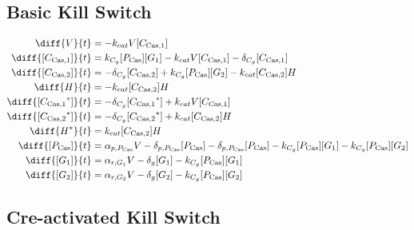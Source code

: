 \subsection{Basic Kill Switch}
\label{s:Basic_kill_switch}

\begin{align}
\diff{\vectorGen{}}{t} & = - \casCutRate{{}}\vectorGen{}\conc{\cplx{\cas}{1}}\\
\diff{\conc{\cplx{\cas}{1}}}{t} & =  \gRnaBind{}\conc{\proSp{\cas{}}}\conc{\gRna{1}} - \casCutRate{{}}\vectorGen{}\conc{\cplx{\cas}{1}} - \casCompDegradeRate{}\conc{\cplx{\cas}{1}}\\
\diff{\conc{\cplx{\cas}{2}}}{t} & = - \casCompDegradeRate{}\conc{\cplx{\cas}{2}} + \gRnaBind{}\conc{\proSp{\cas{}}}\conc{\gRna{2}} - \casCutRate{{}}\conc{\cplx{\cas}{2}}\hostGen{}\\
\diff{\hostGen{}}{t} & = - \casCutRate{{}}\conc{\cplx{\cas}{2}}\hostGen{}\\
\diff{\conc{\bound{\cplx{\cas}{1}}}}{t} & = - \casCompDegradeRate{}\conc{\bound{\cplx{\cas}{1}}} + \casCutRate{{}}\vectorGen{}\conc{\cplx{\cas}{1}}\\
\diff{\conc{\bound{\cplx{\cas}{2}}}}{t} & = - \casCompDegradeRate{}\conc{\bound{\cplx{\cas}{2}}} + \casCutRate{{}}\conc{\cplx{\cas}{2}}\hostGen{}\\
\diff{\edited{\hostGen{}}}{t} & =  \casCutRate{{}}\conc{\cplx{\cas}{2}}\hostGen{}\\
\diff{\conc{\proSp{\cas{}}}}{t} & =  \txtlRate{\proSp{\cas{}}}\vectorGen{} - \proDegradeRate{\proSp{\cas{}}}\conc{\proSp{\cas{}}} - \proDegradeRate{\proSp{\cas{}}}\conc{\proSp{\cas{}}} - \gRnaBind{}\conc{\proSp{\cas{}}}\conc{\gRna{1}} - \gRnaBind{}\conc{\proSp{\cas{}}}\conc{\gRna{2}}\\
\diff{\conc{\gRna{1}}}{t} & =  \txRate{\gRna{1}}\vectorGen{} - \rnaDegradeRate{}\conc{\gRna{1}} - \gRnaBind{}\conc{\proSp{\cas{}}}\conc{\gRna{1}}\\
\diff{\conc{\gRna{2}}}{t} & =  \txRate{\gRna{2}}\vectorGen{} - \rnaDegradeRate{}\conc{\gRna{2}} - \gRnaBind{}\conc{\proSp{\cas{}}}\conc{\gRna{2}}
\end{align}

\subsection{Cre-activated Kill Switch}
\label{s:Cre_delayed_kill_switch}


